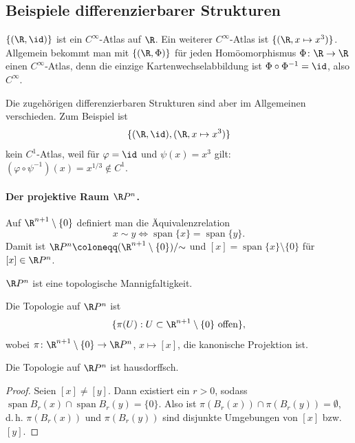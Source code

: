 \documentclass[11pt]{article}
\begin{document}
\subsection{Beispiele differenzierbarer Strukturen}


\begin{example}
  $\{(\R, \id)\}$ ist ein $C^\infty$-Atlas auf $\R$. Ein weiterer $C^\infty$-Atlas ist $\{(\R, x \mapsto x^3)\}$. Allgemein bekommt man mit $\{(\R, \Phi)\}$ für jeden Homöomorphismus $\Phi\colon \R \to \R$ einen $C^\infty$-Atlas, denn die einzige Kartenwechselabbildung ist $\Phi \circ \Phi^{-1} = \id$, also $C^\infty$.

  Die zugehörigen differenzierbaren Strukturen sind aber im Allgemeinen verschieden. Zum Beispiel ist
  \[ \{(\R, \id), (\R, x \mapsto x^3)\} \]
  kein $C^1$-Atlas, weil für $\varphi = \id$ und $\psi(x) = x^3$ gilt: $(\varphi \circ \psi^{-1})(x) = x^{1/3} \notin C^1$.
\end{example}


\paragraph{Der projektive Raum $\R P^n$.}
Auf $\R^{n+1} \setminus \{0\}$ definiert man die Äquivalenzrelation
\[ x \sim y \iff \operatorname{span}\{x\} = \operatorname{span}\{y\}. \]
Damit ist $\R P^n \coloneqq (\R^{n+1} \setminus \{0\}) / {\sim}$ und $[x] = \operatorname{span}\{x\} \setminus \{0\}$ für $[x] \in \R P^n$.

\begin{proposition}\Theorem
  $\R P^n$ ist eine topologische Mannigfaltigkeit.
\end{proposition}

Die Topologie auf $\R P^n$ ist
\[ \{ \pi(U) : U \subset \R^{n+1} \setminus \{0\} \text{ offen} \}, \]
wobei $\pi\colon \R^{n+1} \setminus \{0\} \to \R P^n$, $x \mapsto [x]$, die kanonische Projektion ist.

\begin{lemma}\Theorem
  Die Topologie auf $\R P^n$ ist hausdorffsch.
\end{lemma}

\begin{proof}
  Seien $[x] \neq [y]$. Dann existiert ein $r > 0$, sodass $\operatorname{span} B_r(x) \cap \operatorname{span} B_r(y) = \{0\}$. Also ist $\pi(B_r(x)) \cap \pi(B_r(y)) = \emptyset$, d.\,h. $\pi(B_r(x))$ und $\pi(B_r(y))$ sind disjunkte Umgebungen von $[x]$ bzw. $[y]$.
\end{proof}
\end{document}
